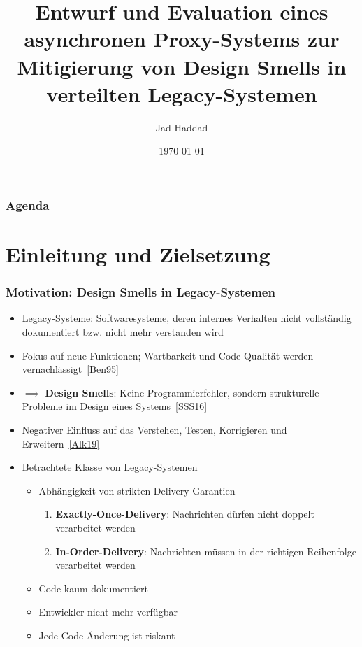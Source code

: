\documentclass[11pt,aspectratio=1610]{beamer} %
\author{Jad Haddad}
\title[ALPS]{{\large Entwurf und Evaluation eines asynchronen Proxy-Systems zur Mitigierung von Design Smells in verteilten Legacy-Systemen}}
\date{\today}
\institute{Parallele und verteilte Systeme}
\begin{document}
\begin{frame}
    \titlepage
\end{frame}

\begin{frame}
    \frametitle{Agenda}
    \tableofcontents[sections={1-7}]
\end{frame}

\section{Einleitung und Zielsetzung}

\begin{frame}
    \frametitle{Motivation: Design Smells in Legacy-Systemen}

    \begin{itemize}
        \item Legacy-Systeme: Softwaresysteme, deren internes Verhalten nicht vollständig dokumentiert bzw. nicht mehr verstanden wird
        \item Fokus auf neue Funktionen; Wartbarkeit und Code-Qualität werden vernachlässigt~\hyperlink{Ben95}{[Ben95]}
        \item $\implies$ \textbf{Design Smells}: Keine Programmierfehler, sondern strukturelle Probleme im Design eines Systems~\hyperlink{SSS16}{[SSS16]}
        \item Negativer Einfluss auf das Verstehen, Testen, Korrigieren und Erweitern~\hyperlink{Alk19}{[Alk19]}
        \item Betrachtete Klasse von Legacy-Systemen
              \begin{itemize}
                  \item Abhängigkeit von strikten Delivery-Garantien
                        \begin{enumerate}
                            \item \textbf{Exactly-Once-Delivery}: Nachrichten dürfen nicht doppelt verarbeitet werden
                            \item \textbf{In-Order-Delivery}: Nachrichten müssen in der richtigen Reihenfolge verarbeitet werden
                        \end{enumerate}
                  \item Code kaum dokumentiert
                  \item Entwickler nicht mehr verfügbar
                  \item \alert{Jede Code-Änderung ist riskant}
              \end{itemize}
    \end{itemize}
\end{frame}
\end{document}
